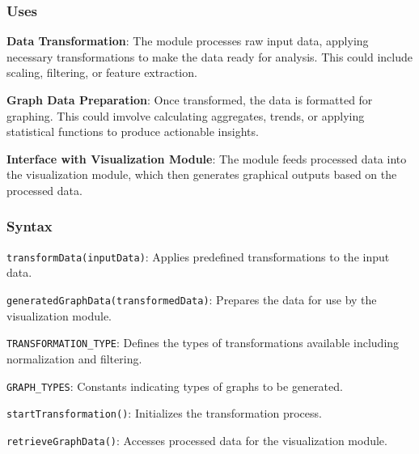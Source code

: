 \documentclass[12pt, titlepage]{article}
\begin{document}
\subsubsection{Uses}
\begin{description}
  \item \textbf{Data Transformation}: The module processes raw input data, applying necessary transformations to make 
  the data ready for analysis. This could include scaling, filtering, or feature extraction.
  \item \textbf{Graph Data Preparation}: Once transformed, the data is formatted for graphing. This could imvolve calculating 
  aggregates, trends, or applying statistical functions to produce actionable insights.
  \item \textbf{Interface with Visualization Module}: The module feeds processed data into the visualization module, which 
  then generates graphical outputs based on the processed data.
\end{description}

\subsubsection{Syntax}
\begin{description}
  \item[Exported Operations:]
  \item
  \texttt{transformData(inputData)}: Applies predefined transformations to the input data.
  \item 
  \texttt{generatedGraphData(transformedData)}: Prepares the data for use by the visualization module.
  \item
  \item[Exported Constants:] 
  \item
  \texttt{TRANSFORMATION\_TYPE}: Defines the types of transformations available including normalization and filtering.
  \item 
  \texttt{GRAPH\_TYPES}: Constants indicating types of graphs to be generated.
  \item
  \item[Exported Access Programs:]
  \item 
  \texttt{startTransformation()}: Initializes the transformation process.
  \item 
  \texttt{retrieveGraphData()}: Accesses processed data for the visualization module.
\end{description}
\end{document}
